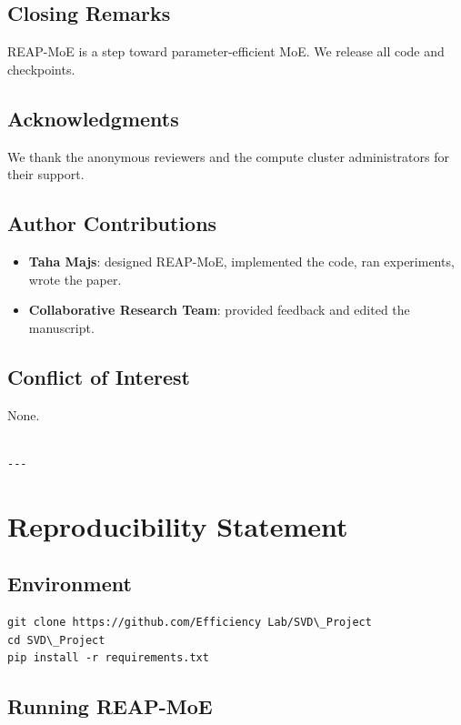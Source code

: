 \subsection{Closing Remarks}

REAP-MoE is a step toward parameter-efficient MoE. We release all code and 
checkpoints.

\subsection{Acknowledgments}

We thank the anonymous reviewers and the compute cluster administrators for their support.

\subsection{Author Contributions}

\begin{itemize}
\item \textbf{Taha Majs}: designed REAP-MoE, implemented the code, ran experiments,
  wrote the paper.
\item \textbf{Collaborative Research Team}: provided feedback and edited the manuscript.

\end{itemize}
\subsection{Conflict of Interest}

None.
\begin{lstlisting}

---
\end{lstlisting}

\section{Reproducibility Statement}

\subsection{Environment}

\begin{lstlisting}
git clone https://github.com/Efficiency Lab/SVD\_Project
cd SVD\_Project
pip install -r requirements.txt
\end{lstlisting}

\subsection{Running REAP-MoE}

